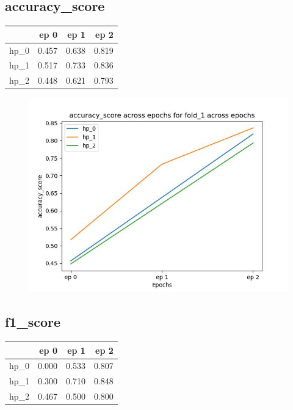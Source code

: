 \documentclass{article}
\begin{document}
\subsection{accuracy\_score}
\begin{tabular}{lrrr}
\toprule
{} &   ep 0 &   ep 1 &   ep 2 \\
\midrule
hp\_0 &  0.457 &  0.638 &  0.819 \\
hp\_1 &  0.517 &  0.733 &  0.836 \\
hp\_2 &  0.448 &  0.621 &  0.793 \\
\bottomrule
\end{tabular}

\begin{figure}[H]
\includegraphics[scale = 0.75]{fold_1/accuracy_score}
\end{figure}
\subsection{f1\_score}
\begin{tabular}{lrrr}
\toprule
{} &   ep 0 &   ep 1 &   ep 2 \\
\midrule
hp\_0 &  0.000 &  0.533 &  0.807 \\
hp\_1 &  0.300 &  0.710 &  0.848 \\
hp\_2 &  0.467 &  0.500 &  0.800 \\
\bottomrule
\end{tabular}
\end{document}
